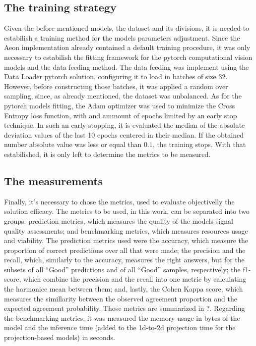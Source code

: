 \subsection{The training strategy}

Given the before-mentioned models, the dataset and its divisions, it is needed to estabilish a training method for the models parameters adjustment. Since the Aeon implementation already contained a default training procedure, it was only necessary to estabilish the fitting framework for the pytorch computational vision models and the data feeding method. The data feeding was implement using the Data Loader pytorch solution, configuring it to load in batches of size 32. However, before constructing those batches, it was applied a random over sampling, since, as already mentioned, the dataset was unbalanced. As for the pytorch models fitting, the Adam optimizer was used to minimize the Cross Entropy loss function, with and ammount of epochs limited by an early stop technique. In such an early stopping, it is evaluated the median of the absolute deviation values of the last 10 epochs centered in their median. If the obtained number absolute value was less or equal than $0.1$, the training stops. With that estabilished, it is only left to determine the metrics to be measured.     

\subsection{The measurements}

Finally, it's necessary to chose the metrics, used to evaluate objectivelly the solution efficacy. The metrics to be used, in this work, can be separated into two groups: prediction metrics, which measures the quality of the models signal quality assessments; and benchmarking metrics, which measures resources usage and viability. The prediction metrics used were the accuracy, which measure the proportion of correct predictions over all that were made; the precision and the recall, which, similarly to the accuracy, measures the right answers, but for the subsets of all ``Good'' predictions and of all ``Good'' samples, respectively; the f1-score, which combine the precision and the recall into one metric by calculating the harmonice mean between them; and, lastly, the Cohen Kappa score, which measures the simillarity between the observed agreement proportion and the expected agreement probability. Those metrics are summarized in ?. Regarding the benchmarking metrics, it was measured the memory usage in bytes of the model and the inference time (added to the 1d-to-2d projection time for the projection-based models) in seconds.


